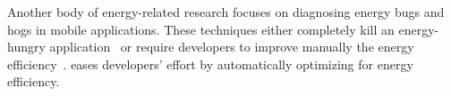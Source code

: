 Another body of energy-related research focuses on diagnosing energy bugs and hogs in mobile applications. These techniques either completely kill an energy-hungry application~\cite{carat} or require developers to improve manually the energy efficiency~\cite{energygreedapis,eprof,eLens}. \webrt eases developers' effort by automatically optimizing for energy efficiency.


